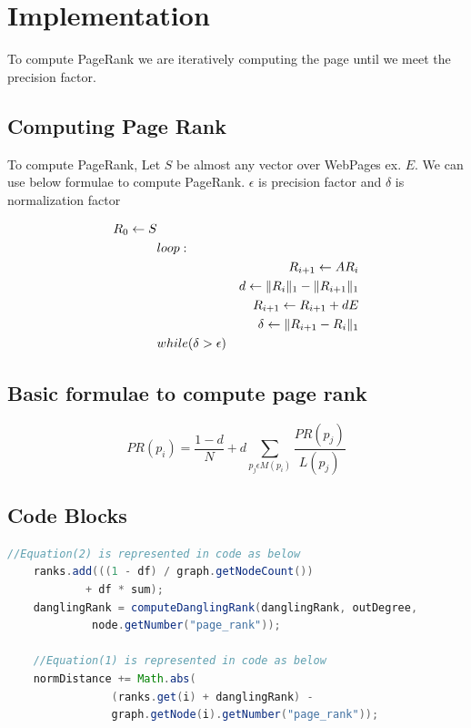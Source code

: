\documentclass{article}
\DeclarePairedDelimiter{\norm}{\lVert}{\rVert}
\begin{document}
\newpage

\section{Implementation}
\label{sec:space}
To compute PageRank we are iteratively computing the page until we meet the precision factor.

\subsection{Computing Page Rank}
\label{sec:computing-page-rank}
To compute PageRank, Let $S$ be almost any vector over WebPages ex. $E$. We can use below formulae to compute PageRank. $\epsilon$ is precision factor and $\delta$ is normalization factor

\begin{equation}
    \begin{align*}
        R_0 \leftarrow S\\
        & loop:\\
            & & R_{i+1} \leftarrow AR_i\\
            & & d \leftarrow \norm{R_i}_1 - \norm{R_{i+1}}_1\\
            & & R_{i+1} \leftarrow R_{i+1} + dE\\
            & & \delta \leftarrow \norm{R_{i+1} - R_{i}}_1\\
        & while(\delta > \epsilon) 
    \end{align*}
\end{equation}

\subsection{Basic formulae to compute page rank}
\label{sec:computing-page-rank}
\begin{equation}
    PR(p_i) = \frac{1-d}{N} + d \sum_{p_j \epsilon M(p_i)} \frac{PR(p_j)}{L(p_j)}
\end{equation}

\subsection{Code Blocks}
\begin{lstlisting}[language=Java]
    //Equation(2) is represented in code as below
    ranks.add(((1 - df) / graph.getNodeCount()) 
            + df * sum);
	danglingRank = computeDanglingRank(danglingRank, outDegree,
             node.getNumber("page_rank"));

    //Equation(1) is represented in code as below
    normDistance += Math.abs(
                (ranks.get(i) + danglingRank) - 
                graph.getNode(i).getNumber("page_rank"));
\end{lstlisting} 
\end{document}
